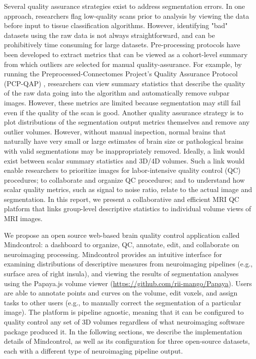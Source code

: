 Several quality assurance strategies exist to address segmentation errors. In one approach, researchers flag low-quality scans prior to analysis by viewing the data before input to tissue classification algorithms.  However, identifying "bad" datasets using the raw data is not always straightforward, and can be prohibitively time consuming for large datasets. Pre-processing protocols have been developed to extract metrics that can be viewed as a cohort-level summary from which outliers are selected for manual quality-assurance. For example, by running the Preprocessed-Connectomes Project’s Quality Assurance Protocol (PCP-QAP) \cite{shehzadpreprocessed}, researchers can view summary statistics that describe the quality of the raw data going into the algorithm and automatically remove subpar images. However, these metrics are limited because segmentation may still fail even if the quality of the scan is good. Another quality assurance strategy is to plot distributions of the segmentation output metrics themselves and remove any outlier volumes. However, without manual inspection, normal brains that naturally have very small or large estimates of brain size or pathological brains with valid segmentations may be inappropriately removed. Ideally, a link would exist between scalar summary statistics and 3D/4D volumes. Such a link would enable researchers to prioritize  images for labor-intensive quality control (QC) procedures; to collaborate and organize QC procedures; and to understand how scalar quality metrics, such as signal to noise ratio, relate to the actual image and segmentation. In this report, we present a collaborative and efficient MRI QC platform that links group-level descriptive statistics to individual volume views of MRI images.  

We propose an open source web-based brain quality control application called Mindcontrol: a dashboard to organize, QC, annotate, edit, and collaborate on neuroimaging processing. Mindcontrol provides an intuitive interface for examining distributions of descriptive measures from neuroimaging pipelines (e.g., surface area of right insula), and viewing the results of segmentation analyses using the Papaya.js volume viewer (\href{https://github.com/rii-mango/Papaya}{https://github.com/rii-mango/Papaya}). Users are able to annotate points and curves on the volume, edit voxels, and assign tasks to other users (e.g., to manually correct the segmentation of a particular image). The platform is pipeline agnostic, meaning that it can be configured to quality control any set of 3D volumes regardless of what neuroimaging software package produced it. In the following sections, we describe the implementation details of Mindcontrol, as well as its configuration for three open-source datasets, each with a different type of neuroimaging pipeline output. 

